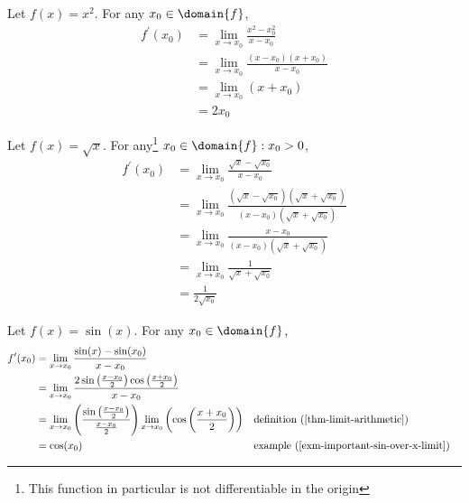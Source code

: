\begin{exm}\label{exm-derivatives:3}
	Let $f(x)=x^2$. For any $x_0\in\domain{f}$,
	\begin{align*}
		f^\prime(x_0) & = \lim_{x \to x_0}\frac{x^2-x_0^2}{x-x_0}      \\
		              & = \lim_{x \to x_0}\frac{(x-x_0)(x+x_0)}{x-x_0} \\
		              & = \lim_{x \to x_0} \left(x+x_0\right)          \\
		              & = 2x_0
	\end{align*}
\end{exm}

\begin{exm}\label{exm-derivatives:4}
	Let $f(x)=\sqrt{x}$. For any\footnote{This function in particular is not
		differentiable in the origin} $x_0\in\domain{f}:x_0>0$,
	\begin{align*}
		f^\prime(x_0) & = \lim_{x \to x_0}\frac{\sqrt{x}-\sqrt{x_0}}{x-x_0}                                               \\
		              & = \lim_{x \to x_0}\frac{(\sqrt{x}-\sqrt{x_0})(\sqrt{x}+\sqrt{x_0})}{(x-x_0)(\sqrt{x}+\sqrt{x_0})} \\
		              & = \lim_{x \to x_0}\frac{x-x_0}{(x-x_0)(\sqrt{x}+\sqrt{x_0})}                                      \\
		              & = \lim_{x \to x_0}\frac{1}{\sqrt{x}+\sqrt{x_0}}                                                   \\
		              & = \frac{1}{2\sqrt{x_0}}
	\end{align*}
\end{exm}

\begin{exm}\label{exm-derivatives:5}
	Let $f(x)=\sin(x)$. For any $x_0\in\domain{f}$,
	\begin{align*}
		f^\prime(x_0) & = \lim_{x \to x_0}\frac{\sin(x)-\sin(x_0)}{x-x_0}                                                                                                                                                               \\
		              & = \lim_{x \to x_0}\frac{2\sin\left(\frac{x-x_0}{2}\right)\cos\left(\frac{x+x_0}{2}\right)}{x-x_0}                                                                                                               \\
		              & = \lim_{x \to x_0}\left(\frac{\sin\left(\frac{x-x_0}{2}\right)}{\frac{x-x_0}{2}}\right)\lim_{x \to x_0}\left(\cos\left(\frac{x+x_0}{2}\right)\right) &  & \text{definition (\ref{thm-limit-arithmetic})}        \\
		              & = \cos(x_0)                                                                                                                                          &  & \text{example (\ref{exm-important-sin-over-x-limit})}
	\end{align*}
\end{exm}

